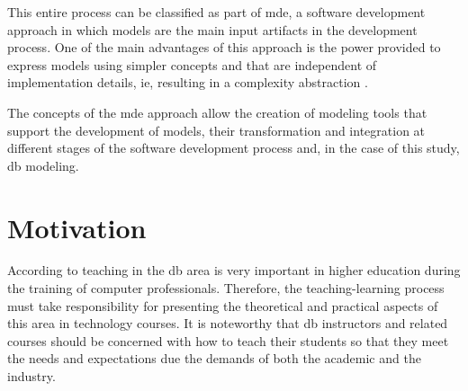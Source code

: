 This entire process can be classified as part of \ac{mde}, a software development approach in which models are the main input artifacts in the development process.
One of the main advantages of this approach is the power provided to express models using simpler concepts and that are independent of implementation details, ie, resulting in a complexity abstraction \cite{Brambilla:2017}.

The concepts of the \ac{mde} approach allow the creation of modeling tools that support the development of models, their transformation and integration at different stages of the software development process and, in the case of this study, \ac{db} modeling.


\section{Motivation}

According to  teaching in the \ac{db} area is very important in higher education during the training of computer professionals.
Therefore, the teaching-learning process must take responsibility for presenting the theoretical and practical aspects of this area in technology courses.
It is noteworthy that \ac{db} instructors and related courses should be concerned with how to teach their students so that they meet the needs and expectations due the demands of both the academic and the industry.

